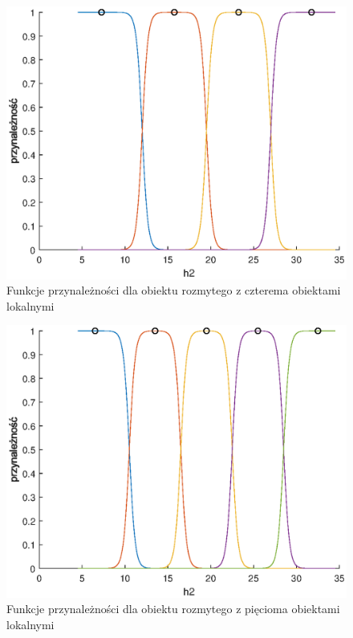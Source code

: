 		\begin{figure}[h!]
			\includegraphics[width=0.9\linewidth]{plots/z2_modelroz_4.eps}
			\caption{Funkcje przynależności dla obiektu rozmytego z czterema obiektami lokalnymi}
			\label{rys:roz4}
		\end{figure}
		\begin{figure}[h!]
			\includegraphics[width=0.9\linewidth]{plots/z2_modelroz_5.eps}
			\caption{Funkcje przynależności dla obiektu rozmytego z pięcioma obiektami lokalnymi}
			\label{rys:roz5}
		\end{figure}
	
